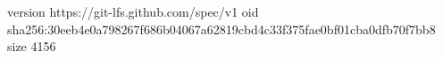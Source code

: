 version https://git-lfs.github.com/spec/v1
oid sha256:30eeb4e0a798267f686b04067a62819cbd4c33f375fae0bf01cba0dfb70f7bb8
size 4156
